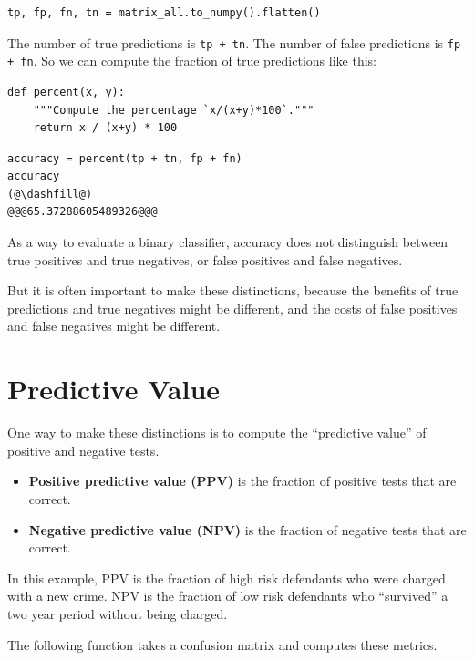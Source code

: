 \begin{lstlisting}[]
tp, fp, fn, tn = matrix_all.to_numpy().flatten()
\end{lstlisting}

The number of true predictions is \passthrough{\lstinline!tp + tn!}. The
number of false predictions is \passthrough{\lstinline!fp + fn!}. So we
can compute the fraction of true predictions like this:

\begin{lstlisting}[]
def percent(x, y):
    """Compute the percentage `x/(x+y)*100`."""
    return x / (x+y) * 100
\end{lstlisting}

\begin{lstlisting}[]
accuracy = percent(tp + tn, fp + fn)
accuracy
(@\dashfill@)
@@@65.37288605489326@@@
\end{lstlisting}

As a way to evaluate a binary classifier, accuracy does not distinguish
between true positives and true negatives, or false positives and false
negatives.

But it is often important to make these distinctions, because the
benefits of true predictions and true negatives might be different, and
the costs of false positives and false negatives might be different.

\hypertarget{predictive-value}{%
\section{Predictive Value}\label{predictive-value}}

One way to make these distinctions is to compute the ``predictive
value'' of positive and negative tests.

\begin{itemize}
\item
  \textbf{Positive predictive value (PPV)} is the fraction of positive
  tests that are correct.
\item
  \textbf{Negative predictive value (NPV)} is the fraction of negative
  tests that are correct.
\end{itemize}

In this example, PPV is the fraction of high risk defendants who were
charged with a new crime. NPV is the fraction of low risk defendants who
``survived'' a two year period without being charged.

The following function takes a confusion matrix and computes these
metrics.

